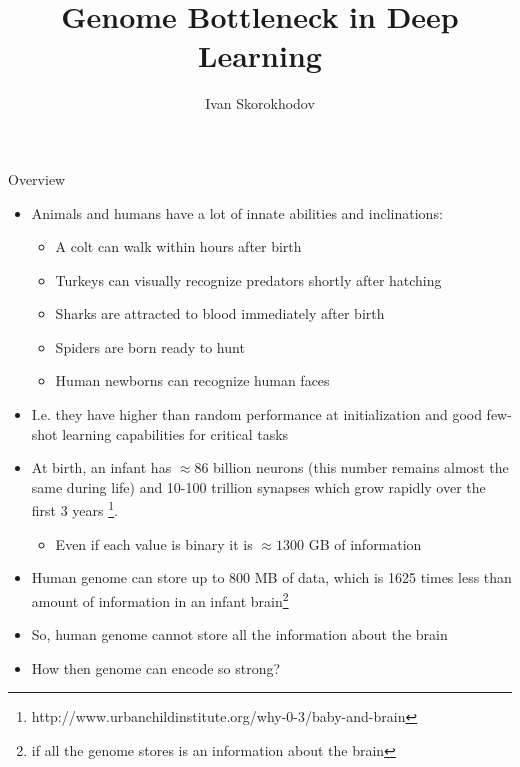 \documentclass[handout, 10pt]{beamer}
\title{Genome Bottleneck in Deep Learning}
\author{Ivan Skorokhodov}
\begin{document}
\begin{frame}
    \titlepage
\end{frame}

\begin{frame}{Overview}
    \begin{itemize}
        \item\pause Animals and humans have a lot of innate abilities and inclinations:
            \begin{itemize}
                \item\pause A colt can walk within hours after birth
                \item\pause Turkeys can visually recognize predators shortly after hatching
                \item\pause Sharks are attracted to blood immediately after birth
                \item\pause Spiders are born ready to hunt
                \item\pause Human newborns can recognize human faces%
            \end{itemize}
        \item\pause I.e. they have higher than random performance at initialization and good few-shot learning capabilities for critical tasks
        \item\pause At birth, an infant has $\approx 86$ billion neurons (this number remains almost the same during life) and 10-100 trillion synapses which grow rapidly over the first 3 years \footnote{http://www.urbanchildinstitute.org/why-0-3/baby-and-brain}.
        \begin{itemize}
            \item\pause Even if each value is binary it is $\approx 1300$ GB of information
        \end{itemize}
        \item\pause Human genome can store up to 800 MB of data, which is 1625 times less than amount of information in an infant brain\footnote{if all the genome stores is an information about the brain}
        \item\pause So, human genome cannot store all the information about the brain
        \item\pause How then genome can encode so strong?
    \end{itemize}
\end{frame}
\end{document}
